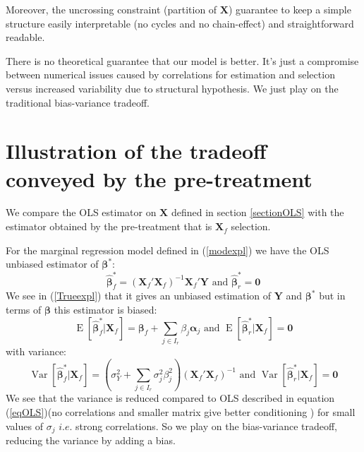 \documentclass[12pt,a4paper]{report}
\begin{document}
Moreover, the uncrossing constraint (partition of $\boldsymbol{X}$) guarantee to keep a simple structure easily interpretable (no cycles and no chain-effect) and straightforward readable.

	
			There is no theoretical guarantee that our model is better. It's just a compromise between numerical issues caused by correlations for estimation and selection versus increased variability due to structural hypothesis. We just play on the traditional bias-variance tradeoff.
			 
	\section{Illustration of the tradeoff conveyed by the pre-treatment}	
	We compare the OLS estimator on $\boldsymbol{X}$ defined in section \ref{sectionOLS} with the estimator obtained by the pre-treatment that is $\boldsymbol{X}_f$ selection.
  
For the marginal regression model defined in (\ref{modexpl})
we have the \textsc{OLS} unbiased estimator of $\boldsymbol{\beta}^*$: 
		\begin{equation}
			\hat{\boldsymbol{\beta}}_f^* = (\boldsymbol{X}_f'\boldsymbol{X}_f)^{-1}\boldsymbol{X}_f'\boldsymbol{Y}  \textrm{ and }\boldsymbol{\hat\beta}_r^* = \boldsymbol{0}
		\end{equation}
		We see in (\ref{Trueexpl}) that it gives an unbiased estimation of $\boldsymbol{Y}$ and $\boldsymbol{\beta^*}$
		but in terms of $\boldsymbol{\beta}$ this estimator is biased:
		\begin{equation}
			\operatorname{E}[\hat{\boldsymbol{\beta}}_f^*|\boldsymbol{X}_f]=\boldsymbol{\beta}_f+\sum_{j \in I_r}\beta_{j}\boldsymbol{\alpha}_j \textrm{ and }\operatorname{E}[\hat{\boldsymbol{\beta}}_r^*|\boldsymbol{X}_f]=\boldsymbol{0}
		\end{equation}
		with variance:
		\begin{equation}
			\operatorname{Var}[\hat{\boldsymbol{\beta}}_f^*|\boldsymbol{X}_f]= (\sigma^2_Y+\sum_{j \in I_r}\sigma^2_{j}\beta_{j}^2 )(\boldsymbol{X}_f' \boldsymbol{X}_f)^{-1}  \textrm{ and }\operatorname{Var}[\hat{\boldsymbol{\beta}}_r^*|\boldsymbol{X}_f]= \boldsymbol{0} 
		\end{equation}
		We see that the variance is reduced compared to OLS described in equation (\ref{eqOLS})(no correlations and smaller matrix give better conditioning ) for small values of $\sigma_j$ $i.e.$ strong correlations. So we play on the bias-variance tradeoff, reducing the variance by adding a bias. 				  
		  
\end{document}
